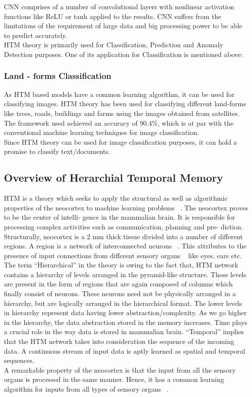 \documentclass[12pt]{article}
\begin{document}
\begin{multicols}{2}
CNN comprises of a number of convolutional layers with nonlinear activation functions like ReLU or tanh applied to the results. CNN suffers from the limitations of the requirement of large data and big processing power to be able to predict accurately.\\HTM theory is primarily used for Classification, Prediction and Anomaly Detection purposes. One of its application for
Classification is mentioned above:
\subsubsection{Land - forms Classification}
As HTM based models have a common learning algorithm,
it can be used for classifying images. HTM theory has been
used for classifying different land-forms like trees, roads,
buildings and farms using the images obtained from satellites.
The framework used achieved an accuracy of 90.4\%, \cite{4} which
is at par with the conventional machine learning techniques for
image classification.\\
Since HTM theory can be used for image classification
purposes, it can hold a promise to classify text/documents.
\subsection{Overview of Herarchial Temporal Memory}
HTM is a theory which seeks to apply the structural as well
as algorithmic properties of the neocortex to machine learning
problems ~\cite{5}. The neocortex proves to be the center of intelli-
gence in the mammalian brain. It is responsible for processing
complex activities such as communication, planning and pre-
diction. Structurally, neocortex is a 2 mm thick tissue divided
into a number of different regions. A region is a network of
interconnected neurons ~\cite{5}. This attributes to the presence of
input connections from different sensory organs 
~\cite{6,7} like
eyes, ears etc. The term “Hierarchical” in the theory is owing
to the fact that, HTM network contains a hierarchy of levels
arranged in the pyramid-like structure. These levels are present
in the form of regions that are again composed of columns
which finally consist of neurons. These neurons need not be
physically arranged in a hierarchy, but are logically arranged in
the hierarchical format. The lower levels in hierarchy represent
data having lower abstraction/complexity. As we go higher
in the hierarchy, the data abstraction stored in the memory
increases. Time plays a crucial role in the way data is stored in
mammalian brain. “Temporal” implies that the HTM network
takes into consideration the sequence of the incoming data. A
continuous stream of input data is aptly learned as spatial and
temporal sequences.\\
A remarkable property of the neocortex is that the input
from all the sensory organs is processed in the same manner.
Hence, it has a common learning algorithm for inputs from
all types of sensory organs ~\cite{5}.


\end{multicols}
\end{document}
